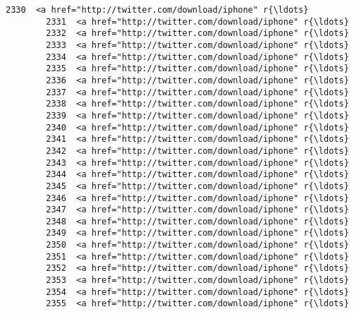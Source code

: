 \documentclass[11pt]{article}
\begin{document}
\begin{Verbatim}[commandchars=\\\{\}]
        2330  <a href="http://twitter.com/download/iphone" r{\ldots}   
        2331  <a href="http://twitter.com/download/iphone" r{\ldots}   
        2332  <a href="http://twitter.com/download/iphone" r{\ldots}   
        2333  <a href="http://twitter.com/download/iphone" r{\ldots}   
        2334  <a href="http://twitter.com/download/iphone" r{\ldots}   
        2335  <a href="http://twitter.com/download/iphone" r{\ldots}   
        2336  <a href="http://twitter.com/download/iphone" r{\ldots}   
        2337  <a href="http://twitter.com/download/iphone" r{\ldots}   
        2338  <a href="http://twitter.com/download/iphone" r{\ldots}   
        2339  <a href="http://twitter.com/download/iphone" r{\ldots}   
        2340  <a href="http://twitter.com/download/iphone" r{\ldots}   
        2341  <a href="http://twitter.com/download/iphone" r{\ldots}   
        2342  <a href="http://twitter.com/download/iphone" r{\ldots}   
        2343  <a href="http://twitter.com/download/iphone" r{\ldots}   
        2344  <a href="http://twitter.com/download/iphone" r{\ldots}   
        2345  <a href="http://twitter.com/download/iphone" r{\ldots}   
        2346  <a href="http://twitter.com/download/iphone" r{\ldots}   
        2347  <a href="http://twitter.com/download/iphone" r{\ldots}   
        2348  <a href="http://twitter.com/download/iphone" r{\ldots}   
        2349  <a href="http://twitter.com/download/iphone" r{\ldots}   
        2350  <a href="http://twitter.com/download/iphone" r{\ldots}   
        2351  <a href="http://twitter.com/download/iphone" r{\ldots}   
        2352  <a href="http://twitter.com/download/iphone" r{\ldots}   
        2353  <a href="http://twitter.com/download/iphone" r{\ldots}   
        2354  <a href="http://twitter.com/download/iphone" r{\ldots}   
        2355  <a href="http://twitter.com/download/iphone" r{\ldots}   
        

\end{Verbatim}
\end{document}
